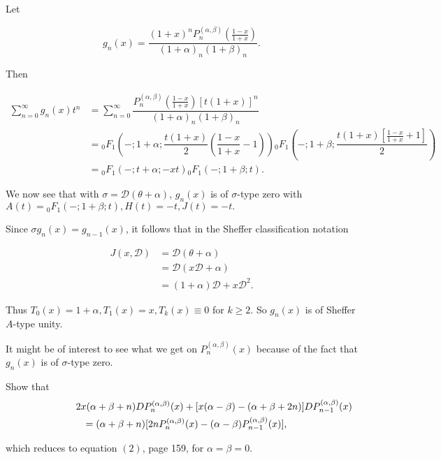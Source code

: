 \begin{solution}
Let 

$$g_n(x) =\dfrac{(1+x)^n P_n^{(\alpha,\beta)}(\frac{1-x}{1+x})}{(1+\alpha)_n (1+\beta)_n}.$$

Then

$$\begin{array}{ll}
\displaystyle\sum_{n=0}^{\infty} g_n(x) t^n &= \displaystyle\sum_{n=0}^{\infty} \dfrac{P_n^{(\alpha,\beta)}(\frac{1-x}{1+x}) [t(1+x)]^n}{(1+\alpha)_n (1+\beta)_n} \\
&= {}_0F_1 \left( -; 1+\alpha; \dfrac{t(1+x)}{2} \left( \dfrac{1-x}{1+x} -1 \right) \right) {}_0F_1 \left( - ; 1 + \beta; \dfrac{t(1+x) \left[\frac{1-x}{1+x}+1 \right]}{2} \right) \\
&={}_0F_1(-;t+\alpha;-xt) {}_0F_1(-;1+\beta;t).
\end{array}$$

We now see that with $\sigma=\mathscr{D}(\theta+\alpha)$, $g_n(x)$ is of $\sigma$-type zero with $A(t) = {}_0F_1(-;1+\beta;t), H(t)=-t, J(t)=-t.$

Since $\sigma g_n(x) = g_{n-1}(x)$, it follows that in the Sheffer classification notation

$$\begin{array}{ll}
J(x,\mathscr{D}) &= \mathscr{D}(\theta+\alpha) \\
&= \mathscr{D}(x \mathscr{D}+\alpha) \\
&= (1+\alpha)\mathscr{D} + x \mathscr{D}^2.
\end{array}$$

Thus $T_0(x) = 1+\alpha, T_1(x)=x, T_k(x) \equiv 0$ for $k \geq 2$. So $g_n(x)$ is of Sheffer $A$-type unity. 

It might be of interest to see what we get on $P_n^{(\alpha,\beta)}(x)$ because of the fact that $g_n(x)$ is of $\sigma$-type zero.
\end{solution}
\begin{problem}\label{problem2chapter16}
Show that
\begin{eqnarray*}
\lefteqn{2x(\alpha+\beta+n)DP_n^{(\alpha,\beta)}(x) + [x(\alpha-\beta) - (\alpha+\beta+2n)]DP_{n-1}^{(\alpha,\beta)}(x)} \\
&& = (\alpha+\beta+n)[2nP_n^{(\alpha,\beta)}(x)-(\alpha-\beta)P_{n-1}^{(\alpha,\beta)}(x)],
\end{eqnarray*}

which reduces to equation $(2)$, page 159, for $\alpha=\beta=0$.
\end{problem}
